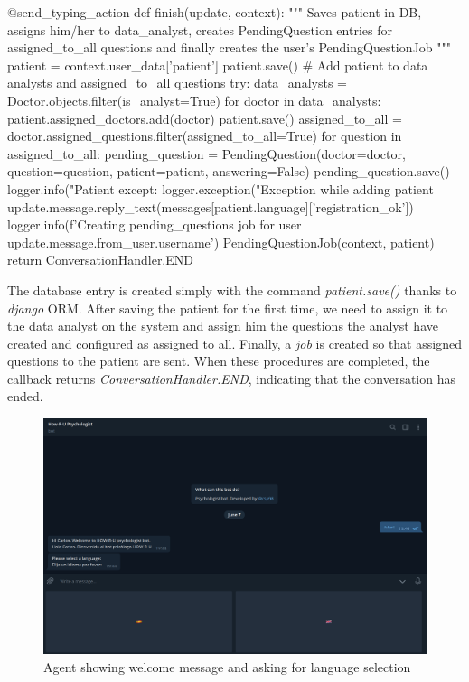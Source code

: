 \documentclass[12pt,english]{article}
\begin{document}
\begin{python}[caption={Patient saver callback}, captionpos=b]
  @send_typing_action
  def finish(update, context):
      """
      Saves patient in DB, assigns him/her to data_analyst, creates PendingQuestion entries for assigned_to_all questions and finally creates the user's PendingQuestionJob
      """
      patient = context.user_data['patient']
      patient.save()
      # Add patient to data analysts and assigned_to_all questions
      try:
          data_analysts = Doctor.objects.filter(is_analyst=True)
          for doctor in data_analysts:
              patient.assigned_doctors.add(doctor)
              patient.save()
              assigned_to_all = doctor.assigned_questions.filter(assigned_to_all=True)
              for question in assigned_to_all:
                  pending_question = PendingQuestion(doctor=doctor, question=question, patient=patient, answering=False)
                  pending_question.save()
          logger.info("Patient %
      except:
          logger.exception("Exception while adding patient %
      update.message.reply_text(messages[patient.language]['registration_ok'])
      logger.info(f'Creating pending_questions job for user {update.message.from_user.username}')
      PendingQuestionJob(context, patient)
      return ConversationHandler.END
\end{python}

The database entry is created simply with the command \emph{patient.save()} thanks to \emph{django} ORM. After saving the patient for the first time, we need to assign it to the data analyst on the system and assign him the questions the analyst have created and configured as assigned to all. Finally, a \emph{job} is created so that assigned questions to the patient are sent. When these procedures are completed, the callback returns \emph{ConversationHandler.END}, indicating that the conversation has ended.

\begin{figure}[H]
  \centering
  \includegraphics[width=\textwidth]{start.png}
  \caption{Agent showing welcome message and asking for language selection}
\end{figure}
\end{document}
